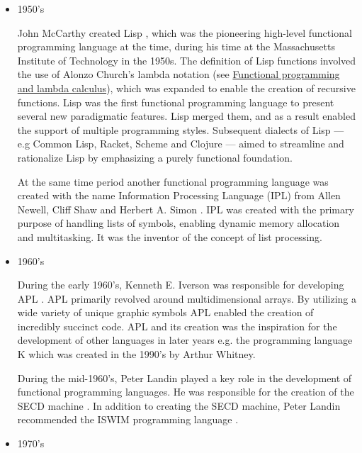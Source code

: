 \documentclass[a4paper, titlepage, twoside]{article}
\begin{document}
\begin{itemize}
\item 1950's

John McCarthy created Lisp \autocite{mccarthyRecursiveFunctionsSymbolic1960}, which was the pioneering high-level functional programming language at the time, during his time at the Massachusetts Institute of Technology in the 1950s. The definition of Lisp functions involved the use of Alonzo Church's lambda notation (see \hyperref[sec:orgf1c62de]{Functional programming and lambda calculus}), which was expanded to enable the creation of recursive functions. Lisp was the first functional programming language to present several new paradigmatic features. Lisp merged them, and as a result enabled the support of multiple programming styles. Subsequent dialects of Lisp --- e.g Common Lisp, Racket, Scheme and Clojure \autocite{steeleCOMMONLISPLanguage1984,felleisenRacketManifesto2015,abelsonRevisedReportAlgorithmic1998,hickeyHistoryClojure2020} --- aimed to streamline and rationalize Lisp by emphasizing a purely functional foundation.

At the same time period another functional programming language was created with the name Information Processing Language (IPL) from Allen Newell, Cliff Shaw and Herbert A. Simon  \autocite{newellIntroductionInformationProcessing1960}. IPL was created with the primary purpose of handling lists of symbols, enabling dynamic memory allocation and multitasking. It was the inventor of the concept of list processing.

\item 1960's

During the early 1960's, Kenneth E. Iverson was responsible for developing APL \autocite{iversonProgrammingLanguage1962}. APL primarily revolved around multidimensional arrays. By utilizing a wide variety of unique graphic symbols APL enabled the creation of incredibly succinct code. APL and its creation was the inspiration for the development of other languages in later years e.g. the programming language K which was created in the 1990's by Arthur Whitney.

During the mid-1960's, Peter Landin played a key role in the development of functional programming languages. He was responsible for the creation of the SECD machine \autocite{landinMechanicalEvaluationExpressions1964}. In addition to creating the SECD machine, Peter Landin recommended the ISWIM programming language \autocite{landinNext700Programming1966}.

\item 1970's


\end{itemize}
\end{document}
